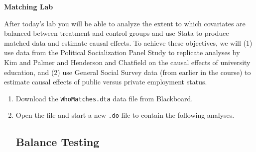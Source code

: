 \documentclass[a4paper,12pt]{article}
\begin{document}
\begin{center}
\textbf{Matching Lab}
\end{center}

After today's lab you will be able to analyze the extent to which covariates are balanced between treatment and control groups and use Stata to produce matched data and estimate causal effects. To achieve these objectives, we will (1) use data from the Political Socialization Panel Study to replicate analyses by Kim and Palmer and Henderson and Chatfield on the causal effects of university education, and (2) use General Social Survey data (from earlier in the course) to estimate causal effects of public versus private employment status.

\begin{enumerate}\itemsep0.5em

\item Download the \texttt{WhoMatches.dta} data file from Blackboard.
\item Open the file and start a new \texttt{.do} file to contain the following analyses.

\subsection*{Balance Testing}


\end{enumerate}
\end{document}
